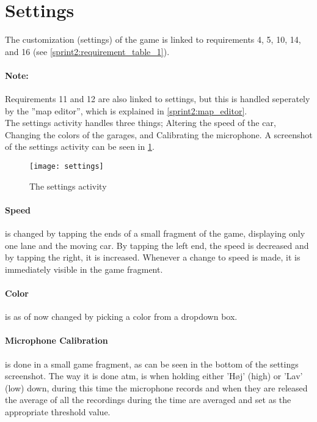\section{Settings}

The customization (settings) of the game is linked to requirements 4, 5, 10, 14, and 16 (see \cref{sprint2:requirement_table_1}).

\paragraph{Note:} Requirements 11 and 12 are also linked to settings, but this is handled seperately by the ''map editor'', which is explained in \cref{sprint2:map_editor}.\\

\noindent
The settings activity handles three things; Altering the speed of the car, Changing the colors of the garages, and Calibrating the microphone.
A screenshot of the settings activity can be seen in \cref{sprint2:settings:fig}.

\begin{center}
\begin{figure}
\texttt{[image: settings]}
\caption{The settings activity}
\label{sprint2:settings:fig}
\end{figure}
\end{center}



\paragraph{Speed} is changed by tapping the ends of a small fragment of the game, displaying only one lane and the moving car.
By tapping the left end, the speed is decreased and by tapping the right, it is increased.
Whenever a change to speed is made, it is immediately visible in the game fragment.

\paragraph{Color} is as of now changed by picking a color from a dropdown box.

\paragraph{Microphone Calibration} is done in a small game fragment, as can be seen in the bottom of the settings screenshot.
The way it is done atm, is when holding either 'H\o j' (high) or 'Lav' (low) down, during this time the microphone records and when they are released the average of all the recordings during the time are averaged and set as the appropriate threshold value.

